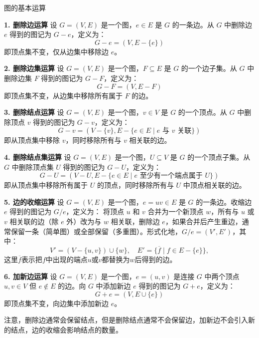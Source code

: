 \documentclass[lang=cn,11pt]{elegantbook}
\begin{document}
\begin{definition}{图的基本运算}

\textbf{1. 删除边运算}
设 $G = (V, E)$ 是一个图，$e \in E$ 是 $G$ 的一条边。从 $G$ 中删除边 $e$ 得到的图记为 $G - e$，定义为：
\[
G - e = (V, E - \{e\})
\]
即顶点集不变，仅从边集中移除边 $e$。

\textbf{2. 删除边集运算}
设 $G = (V, E)$ 是一个图，$F \subseteq E$ 是 $G$ 的一个边子集。从 $G$ 中删除边集 $F$ 得到的图记为 $G - F$，定义为：
\[
G - F = (V, E- F)
\]
即顶点集不变，从边集中移除所有属于 $F$ 的边。

\textbf{3. 删除结点运算}
设 $G = (V, E)$ 是一个图，$v \in V$ 是 $G$ 的一个顶点。从 $G$ 中删除顶点 $v$ 得到的图记为 $G - v$，定义为：
\[
G - v = (V - \{v\}, E-\{e \in E \mid e\text{ 与 }v\text{ 关联}\})
\]
即从顶点集中移除 $v$，同时移除所有与 $v$ 相关联的边。

\textbf{4. 删除结点集运算}
设 $G = (V, E)$ 是一个图，$U \subseteq V$ 是 $G$ 的一个顶点子集。从 $G$ 中删除顶点集 $U$ 得到的图记为 $G - U$，定义为：
\[
G - U = (V - U, E - \{e \in E \mid e\text{ 至少有一个端点属于 }U\})
\]
即从顶点集中移除所有属于 $U$ 的顶点，同时移除所有与 $U$ 中顶点相关联的边。

\textbf{5. 边的收缩运算}
设 $G = (V, E)$ 是一个图，$e = uv \in E$ 是 $G$ 的一条边。收缩边 $e$ 得到的图记为 $G/e$，定义为：
将顶点 $u$ 和 $v$ 合并为一个新顶点 $w$，所有与 $u$ 或 $v$ 相关联的边（除 $e$ 外）改为与 $w$ 相关联，删除边 $e$，如果合并后产生重边，通常保留一条（简单图）或全部保留（多重图）。形式化地，$G/e = (V', E')$，其中：
\[
V' = (V - \{u, v\}) \cup \{w\}, \quad
E' = \{\overline{f}\mid f\in E-\{e\}\},
\]
这里$\overline{f}$表示把$f$中出现的端点$u$或$v$都替换为$w$后得到的边。

\textbf{6. 加新边运算}
设 $G = (V, E)$ 是一个图，$e = (u,v)$ 是连接 $G$ 中两个顶点 $u, v \in V$ 但 $e \notin E$ 的边。向 $G$ 中添加新边 $e$ 得到的图记为 $G + e$，定义为：
\[
G + e = (V, E \cup \{e\})
\]
即顶点集不变，向边集中添加新边 $e$。
\end{definition}
注意，删除边通常会保留结点，但是删除结点通常不会保留边，加新边不会引入新的结点，边的收缩会影响结点的数量。
\end{document}

